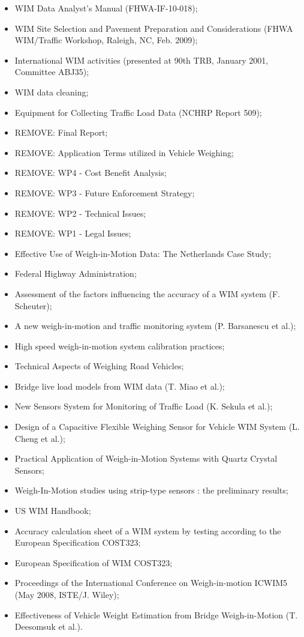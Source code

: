 \documentclass{ufscThesis}
\begin{document}
\begin{itemize}
\item WIM Data Analyst's Manual (FHWA-IF-10-018);
\item WIM Site Selection and Pavement Preparation and Considerations (FHWA WIM/Traffic Workshop, Raleigh, NC, Feb. 2009);
\item International WIM activities (presented at 90th TRB, January 2001, Committee ABJ35);
\item WIM data cleaning;
\item Equipment for Collecting Traffic Load Data (NCHRP Report 509);
\item REMOVE: Final Report;
\item REMOVE: Application Terms utilized in Vehicle Weighing;
\item REMOVE: WP4 - Cost Benefit Analysis;
\item REMOVE: WP3 - Future Enforcement Strategy;
\item REMOVE: WP2 - Technical Issues;
\item REMOVE: WP1 - Legal Issues;
\item Effective Use of Weigh-in-Motion Data: The Netherlands Case Study;
\item Federal Highway Administration;
\item Assessment of the factors influencing the accuracy of a WIM system (F. Scheuter);
\item A new weigh-in-motion and traffic monitoring system (P. Barsanescu et al.);
\item High speed weigh-in-motion system calibration practices;
\item Technical Aspects of Weighing Road Vehicles;
\item Bridge live load models from WIM data (T. Miao et al.);
\item New Sensors System for Monitoring of Traffic Load (K. Sekula et al.);
\item Design of a Capacitive Flexible Weighing Sensor for Vehicle WIM System (L. Cheng et al.);
\item Practical Application of Weigh-in-Motion Systems with Quartz Crystal Sensors;
\item Weigh-In-Motion studies using strip-type sensors : the preliminary results;
\item US WIM Handbook;
\item Accuracy calculation sheet of a WIM system by testing according to the European Specification COST323;
\item European Specification of WIM COST323;
\item Proceedings of the International Conference on Weigh-in-motion ICWIM5 (May 2008, ISTE/J. Wiley);
\item Effectiveness of Vehicle Weight Estimation from Bridge Weigh-in-Motion (T. Deesomsuk et al.).
\end{itemize}
\end{document}
